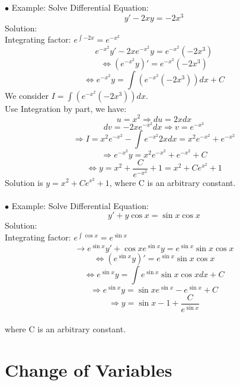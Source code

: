 \documentclass[12pt]{article}
\begin{document}
$\bullet$ Example: Solve Differential Equation: \\
$$y' - 2xy =  -2x^3$$
Solution: \\
Integrating factor: $e^{\int -2x} = e^{-x^2}$
$$e^{-x^2}y'-2xe^{-x^2}y = e^{-x^2}(  -2x^3)$$
$$\Leftrightarrow (e^{-x^2}y)' =  e^{-x^2}(  -2x^3)$$
$$\Leftrightarrow e^{-x^2}y =  \int (  e^{-x^2}(  -2x^3))dx +C$$
We consider $I = \int (  e^{-x^2}(  -2x^3))dx $.\\
Use Integration by part, we have: 
$$ u = x^2 \Rightarrow du = 2xdx$$
$$dv = -2xe^{-x^2}dx \Rightarrow v= e^{-x^2} $$
$$\Rightarrow I = x^2e^{-x^2} - \int e^{-x^2}2xdx = x^2e^{-x^2}+ e^{-x^2}$$
$$\Rightarrow e^{-x^2}y =x^2e^{-x^2}+ e^{-x^2} +C $$
$$\Leftrightarrow y = x^2 +\frac{C}{e^{-x^2}}+1 = x^2 +Ce^{x^2}+1$$
Solution is $y = x^2 +Ce^{x^2}+1 $, where C is an arbitrary constant. 
\\
\\
$\bullet$ Example: Solve Differential Equation:\\
$$ y' +y\cos x = \sin x\cos x$$
Solution: 
\\
Integrating factor: $e^{\int \cos x} = e^{\sin x}$
$$\rightarrow e^{\sin x}y'+ \cos x e^{\sin x}y = e^{\sin x}\sin x\cos x$$
$$\Leftrightarrow (e^{\sin x}y)' = e^{\sin x}\sin x\cos x $$
$$\Leftrightarrow e^{\sin x}y = \int e^{\sin x}\sin x\cos x dx +C$$
$$\Rightarrow e^{\sin x}y = \sin xe^{\sin x} - e^{\sin x} +C$$
$$\Rightarrow y = \sin x -1 + \frac{C}{e^{\sin x}}$$
\\
where C is an arbitrary constant. 
\\
\section{Change of Variables}
\end{document}
